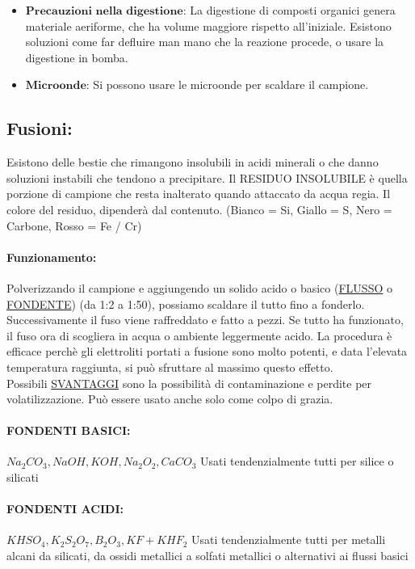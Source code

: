 \documentclass{article}
\begin{document}
\begin{itemize}
\begin{center}
\begin{minipage}{0.4\textwidth}
		\end{minipage}
	\end{center}
	\item {$\mathbf{Precauzioni}$ $\mathbf{nella}$ $\mathbf{digestione}$:} La digestione di composti organici genera materiale aeriforme, che ha volume maggiore rispetto all'iniziale. Esistono soluzioni come far defluire man mano che la reazione procede, o usare la digestione in bomba.
	\item {$\mathbf{Microonde}$:} Si possono usare le microonde per scaldare il campione.
\end{itemize}
 
\subsection{Fusioni:} Esistono delle bestie che rimangono insolubili in acidi minerali o che danno soluzioni instabili che tendono a precipitare. Il RESIDUO INSOLUBILE è quella porzione di campione che resta inalterato quando attaccato da acqua regia.
Il colore del residuo, dipenderà dal contenuto. (Bianco = Si, Giallo = S, Nero = Carbone, Rosso = Fe / Cr)

\paragraph{Funzionamento:} Polverizzando il campione e aggiungendo un solido acido o basico (\underline{FLUSSO} o \underline{FONDENTE}) (da 1:2 a 1:50), possiamo scaldare il tutto fino a fonderlo. Successivamente il fuso viene raffreddato e fatto a pezzi. Se tutto ha funzionato, il fuso ora di scogliera in acqua o ambiente leggermente acido.
La procedura è efficace perchè gli elettroliti portati a fusione sono molto potenti, e data l'elevata temperatura raggiunta, si può sfruttare al massimo questo effetto. 
\\Possibili \underline{SVANTAGGI} sono la possibilità di contaminazione e perdite per volatilizzazione. Può essere usato anche solo come colpo di grazia.

\paragraph{FONDENTI BASICI:} $Na_2CO_3, NaOH, KOH, Na_2O_2, CaCO_3$ Usati tendenzialmente tutti per silice o silicati 
\paragraph{FONDENTI ACIDI:} $KHSO_4, K_2S_2O_7, B_2O_3, KF + KHF_2$ Usati tendenzialmente tutti per metalli alcani da silicati, da ossidi metallici a solfati metallici o alternativi ai flussi basici	 
\end{document}
